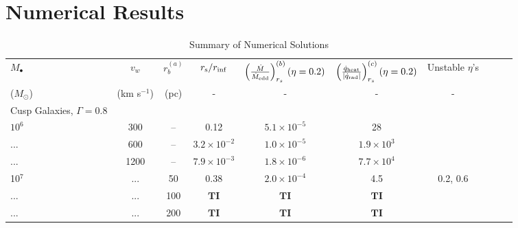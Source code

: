 \documentclass[usenatbib,fleqn]{mn2e}
\begin{document}



\section{Numerical Results}
\label{sec:numerical}

\begin{table}
\begin{threeparttable}
\begin{minipage}{18cm}
  \caption{Summary of Numerical Solutions}
\begin{tabular}{lccccccccc}
  \hline
  {$M_{\bullet}$} & {$v_{w}$} & {$r_b^{(a)}$} &   $r_{\rm s}/r_{\rm
    inf}$ &  {$\left(\frac{\dot{M}}{\dot{M}_{\rm edd}}\right)_{r_{s}}^{(b)}
      (\eta=0.2)$} & {$\left(\frac{\dot{q}_{\rm heat}}{|\dot{q}_{\rm
            rad}|}\right)_{r_s}^{(c)} (\eta=0.2)$} & Unstable $\eta$'s  \\
    ($M_{\odot}$) & (km s$^{-1}$) & (pc) &- & - & - &  - & \\ 
    \hline
    Cusp Galaxies, $\Gamma = 0.8$ & & & & & & & & \\
    $    10^{ 6 }$ & 300 & -- & 0.12 & $ 5.1 \times 10^{ -5 }$ & 28 \\
    ... & 600 & -- & $ 3.2 \times 10^{ -2 }$ & $ 1.0 \times 10^{ -5 }$ & $ 1.9 \times 10^{ 3 }$ \\
    ... & 1200 & -- & $ 7.9 \times 10^{ -3 }$ & $ 1.8 \times 10^{ -6 }$ & $ 7.7 \times 10^{ 4 }$ \\
   10$^{7}$ & ... & 50 & 0.38 & $ 2.0 \times 10^{ -4 }$ & 4.5 & 0.2, 0.6\\
... & ... & 100 & $\mathbf{TI}$ & $\mathbf{TI}$ & $\mathbf{TI}$ \\
... & ... & 200 & $\mathbf{TI}$ & $\mathbf{TI}$ & $\mathbf{TI}$ \\

\end{tabular}
\end{minipage}
\end{threeparttable}
\end{table}
\end{document}

